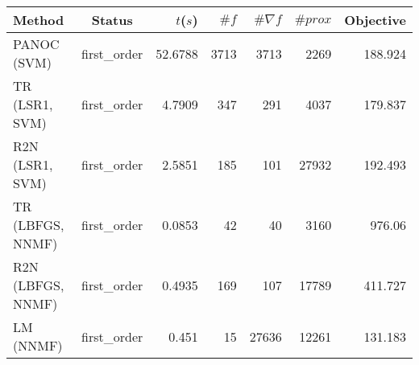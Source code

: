 \begin{tabular}{lcrrrrr}
  \hline
  \textbf{Method} & \textbf{Status} & \textbf{$t$($s$)} & \textbf{$\#f$} & \textbf{$\#\nabla f$} & \textbf{$\#prox$} & \textbf{Objective} \\\hline
  PANOC (SVM) & first\_order & 52.6788 & 3713 & 3713 & 2269 & 188.924 \\
  TR (LSR1, SVM) & first\_order & 4.7909 & 347 & 291 & 4037 & 179.837 \\
  R2N (LSR1, SVM) & first\_order & 2.5851 & 185 & 101 & 27932 & 192.493 \\
  TR (LBFGS, NNMF) & first\_order & 0.0853 & 42 & 40 & 3160 & 976.06 \\
  R2N (LBFGS, NNMF) & first\_order & 0.4935 & 169 & 107 & 17789 & 411.727 \\
  LM (NNMF) & first\_order & 0.451 & 15 & 27636 & 12261 & 131.183 \\\hline
\end{tabular}
